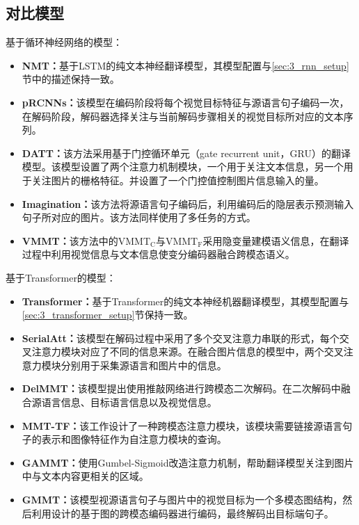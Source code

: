 \subsection{对比模型}
基于循环神经网络的模型：
\begin{itemize}
    \item \textbf{NMT：}基于LSTM的纯文本神经翻译模型，其模型配置与\ref{sec:3_rnn_setup}节中的描述保持一致。
    \item \textbf{pRCNNs：}该模型在编码阶段将每个视觉目标特征与源语言句子编码一次，在解码阶段，解码器选择关注与当前解码步骤相关的视觉目标所对应的文本序列。
    \item \textbf{DATT：}该方法采用基于门控循环单元（gate recurrent unit，GRU）的翻译模型。该模型设置了两个注意力机制模块，一个用于关注文本信息，另一个用于关注图片的栅格特征。并设置了一个门控值控制图片信息输入的量。
    \item \textbf{Imagination：}该方法将源语言句子编码后，利用编码后的隐层表示预测输入句子所对应的图片。该方法同样使用了多任务的方式。
    \item \textbf{VMMT：}该方法中的$ \mathrm{VMMT_C} $与$ \mathrm{VMMT_F} $采用隐变量建模语义信息，在翻译过程中利用视觉信息与文本信息使变分编码器融合跨模态语义。
\end{itemize}

基于Transformer的模型：
\begin{itemize}
    \item \textbf{Transformer：}基于Transformer的纯文本神经机器翻译模型，其模型配置与\ref{sec:3_transformer_setup}节保持一致。
    \item \textbf{SerialAtt：}该模型在解码过程中采用了多个交叉注意力串联的形式，每个交叉注意力模块对应了不同的信息来源。在融合图片信息的模型中，两个交叉注意力模块分别用于采集源语言和图片中的信息。
    \item \textbf{DelMMT：}该模型提出使用推敲网络进行跨模态二次解码。在二次解码中融合源语言信息、目标语言信息以及视觉信息。
    \item \textbf{MMT-TF：}该工作设计了一种跨模态注意力模块，该模块需要链接源语言句子的表示和图像特征作为自注意力模块的查询。
    \item \textbf{GAMMT：}使用Gumbel-Sigmoid改造注意力机制，帮助翻译模型关注到图片中与文本内容更相关的区域。
    \item \textbf{GMMT：}该模型视源语言句子与图片中的视觉目标为一个多模态图结构，然后利用设计的基于图的跨模态编码器进行编码，最终解码出目标端句子。
\end{itemize}
